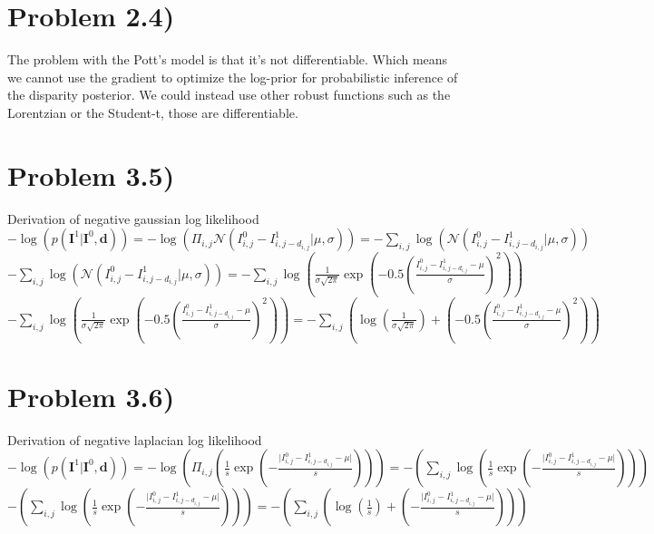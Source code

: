 \documentclass[11pt]{article} %
\begin{document}
	\section*{Problem 2.4)}
	The problem with the Pott's model is that it's not differentiable. Which means we cannot use the gradient to optimize the log-prior for probabilistic inference of the disparity posterior. We could instead use other robust functions such as the Lorentzian or the Student-t, those are differentiable.
 
 	\newpage
 	\section*{Problem 3.5)}
 	Derivation of negative gaussian log likelihood\\
 	$- \log \left( p(\textbf{I}^1 \vert \textbf{I}^0, \textbf{d})\right) = - \log \left( \Pi_{i,j} \mathcal{N}\left( I^0 _{i,j} - I^1 _{i,j - d_{i,j}} \lvert \mu , \sigma \right) \right) = - \sum_{i,j} \log \left(\mathcal{N}\left( I^0 _{i,j} - I^1 _{i,j - d_{i,j}} \lvert \mu , \sigma \right)\right)$\\
 	$- \sum_{i,j} \log \left(\mathcal{N}\left( I^0 _{i,j} - I^1 _{i,j - d_{i,j}} \lvert \mu , \sigma \right)\right) = - \sum_{i,j} \log \left( \frac{1}{\sigma \sqrt{2\pi}} \exp\left(-0.5 \left(\frac{I^0 _{i,j} - I^1 _{i,j - d_{i,j}} - \mu}{\sigma}\right)^2\right)\right)$\\
  	$- \sum_{i,j} \log \left( \frac{1}{\sigma \sqrt{2\pi}} \exp\left(-0.5 \left(\frac{I^0 _{i,j} - I^1 _{i,j - d_{i,j}} - \mu}{\sigma}\right)^2\right)\right) = - \sum_{i,j} \left( \log \left( \frac{1}{\sigma \sqrt{2\pi}}\right) + \left(-0.5 \left(\frac{I^0 _{i,j} - I^1 _{i,j - d_{i,j}} - \mu}{\sigma}\right)^2\right)\right)$
 	\section*{Problem 3.6)}
  	Derivation of negative laplacian log likelihood\\
 	$- \log \left( p(\textbf{I}^1 \vert \textbf{I}^0, \textbf{d})\right) = - \log \left( \Pi_{i,j} \left( \frac{1}{s} \exp \left( -\frac{ \lvert I^0 _{i,j} - I^1 _{i,j - d_{i,j}} - \mu \lvert}{s} \right) \right)\right) = - \left( \sum_{i,j} \log \left( \frac{1}{s} \exp \left( -\frac{ \lvert I^0 _{i,j} - I^1 _{i,j - d_{i,j}} - \mu \lvert}{s} \right) \right)\right) $\\
	 $- \left( \sum_{i,j} \log \left( \frac{1}{s} \exp \left( -\frac{ \lvert I^0 _{i,j} - I^1 _{i,j - d_{i,j}} - \mu \lvert}{s} \right) \right)\right) = - \left( \sum_{i,j} \left( \log \left( \frac{1}{s}\right) + \left( -\frac{ \lvert I^0 _{i,j} - I^1 _{i,j - d_{i,j}} - \mu \lvert}{s} \right) \right)\right) $\\
\end{document}
